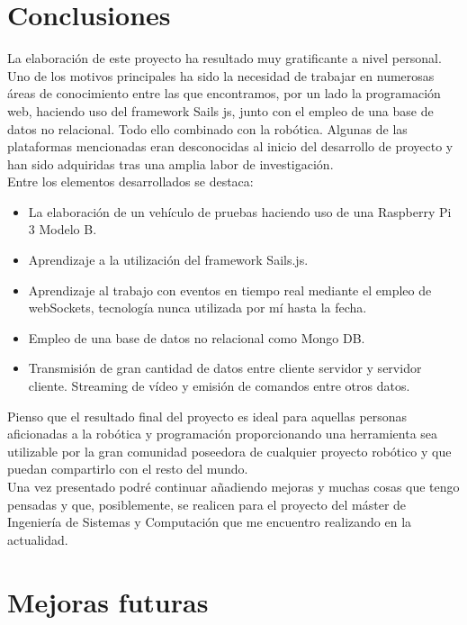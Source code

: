 \documentclass[a4paper,12pt]{article}
\begin{document}
\section{Conclusiones}


La elaboración de este proyecto ha resultado muy gratificante a nivel personal. Uno de los motivos principales ha sido la necesidad de trabajar en numerosas áreas de conocimiento entre las que 
encontramos, por un lado la programación web, haciendo uso del framework Sails js, junto con el empleo de una base de datos no relacional. 
Todo ello combinado con la robótica. Algunas de las plataformas mencionadas eran desconocidas al inicio del desarrollo de proyecto y han sido adquiridas tras una amplia labor de investigación.\\

Entre los elementos desarrollados se destaca:

\begin{itemize}
 \item La elaboración de un vehículo de pruebas haciendo uso de una Raspberry Pi 3 Modelo B.
 \item Aprendizaje a la utilización del framework Sails.js.
 \item Aprendizaje al trabajo con eventos en tiempo real mediante el empleo de webSockets, tecnología nunca utilizada por mí hasta la fecha.
 \item Empleo de una base de datos no relacional como Mongo DB.
 \item Transmisión de gran cantidad de datos entre cliente servidor y servidor cliente. Streaming de vídeo y emisión de comandos entre otros datos.\\
\end{itemize}


Pienso que el resultado final del proyecto es ideal para aquellas personas aficionadas a la robótica y programación proporcionando una herramienta sea utilizable por la gran comunidad poseedora 
de cualquier proyecto robótico y que puedan compartirlo con el resto del mundo.\\

Una vez presentado podré continuar añadiendo mejoras y muchas cosas que tengo pensadas y que, posiblemente, se realicen para el proyecto del máster de Ingeniería de Sistemas y Computación que me 
encuentro realizando en la actualidad.\\

\section{Mejoras futuras}
\end{document}
